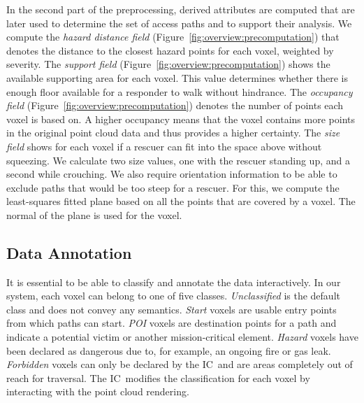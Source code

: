 \documentclass[conference,10pt,letter]{IEEEtran}
\def\IC{IC}
\begin{document}
In the second part of the preprocessing, derived attributes are computed that are later used to determine the set of access paths and to support their analysis. We compute the \emph{hazard distance field} (Figure~\ref{fig:overview:precomputation}) that denotes the distance to the closest hazard points for each voxel, weighted by severity. The \emph{support field} (Figure~\ref{fig:overview:precomputation}) shows the available supporting area for each voxel. This value determines whether there is enough floor available for a responder to walk without hindrance. The \emph{occupancy field} (Figure~\ref{fig:overview:precomputation}) denotes the number of points each voxel is based on. A higher occupancy means that the voxel contains more points in the original point cloud data and thus provides a higher certainty. The \emph{size field} shows for each voxel if a rescuer can fit into the space above without squeezing. We calculate two size values, one with the rescuer standing up, and a second while crouching. We also require orientation information to be able to exclude paths that would be too steep for a rescuer. For this, we compute the least-squares fitted plane based on all the points that are covered by a voxel. The normal of the plane is used for the voxel.

\subsection{Data Annotation} \label{sec:overview:annotation}
It is essential to be able to classify and annotate the data interactively. In our system, each voxel can belong to one of five classes. \emph{Unclassified} is the default class and does not convey any semantics. \emph{Start} voxels are usable entry points from which paths can start. \emph{POI} voxels are destination points for a path and indicate a potential victim or another mission-critical element. \emph{Hazard} voxels have been declared as dangerous due to, for example, an ongoing fire or gas leak. \emph{Forbidden} voxels can only be declared by the \IC\ and are areas completely out of reach for traversal. The \IC\ modifies the classification for each voxel by interacting with the point cloud rendering.
\end{document}
